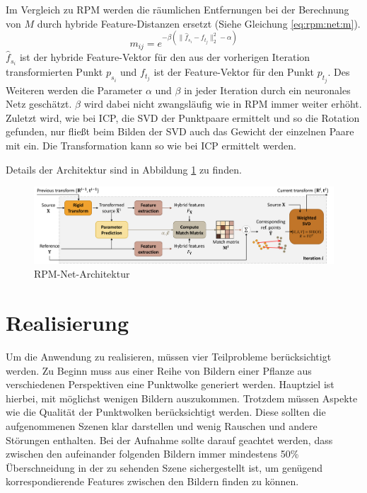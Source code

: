 \documentclass[12pt,titlepage, twoside]{article}
\begin{document}
Im Vergleich zu RPM werden die räumlichen Entfernungen bei der Berechnung von $M$ durch hybride Feature-Distanzen ersetzt (Siehe Gleichung \ref{eq:rpm:net:m}).
\begin{equation}
    \label{eq:rpm:net:m}
    m_{ij} = e^{-\beta(\|\hat{f}_{s_i} - f_{t_j}\|_2^2-\alpha)}
\end{equation}
$\hat{f}_{s_i}$ ist der hybride Feature-Vektor für den aus der vorherigen Iteration transformierten Punkt $p_{s_i}$ und $f_{t_j}$ ist der Feature-Vektor für den Punkt $p_{t_j}$.
Des Weiteren werden die Parameter $\alpha$ und $\beta$ in jeder Iteration durch ein neuronales Netz geschätzt. 
$\beta$ wird dabei nicht zwangsläufig wie in RPM immer weiter erhöht.
Zuletzt wird, wie bei ICP, die SVD der Punktpaare ermittelt und so die Rotation gefunden, nur fließt beim Bilden der SVD auch das Gewicht der einzelnen Paare mit ein. 
Die Transformation kann so wie bei ICP ermittelt werden. 

 Details der Architektur sind in Abbildung \ref{fig:rpm:net:arch} zu finden.

\begin{figure}
    \centering
    \includegraphics[width=1.0\textwidth]{./Images/RPM_Net_Arch.png}
    \caption{RPM-Net-Architektur \cite{Yew_2020}}
    \label{fig:rpm:net:arch}
\end{figure}

\newpage
\section{Realisierung}
\label{sec:realisierung}
Um die Anwendung zu realisieren, müssen vier Teilprobleme berücksichtigt werden. Zu Beginn muss aus einer Reihe von Bildern einer Pflanze aus verschiedenen Perspektiven eine Punktwolke generiert werden. 
Hauptziel ist hierbei, mit möglichst wenigen Bildern auszukommen. 
Trotzdem müssen Aspekte wie die Qualität der Punktwolken berücksichtigt werden. Diese sollten die aufgenommenen Szenen klar darstellen und wenig Rauschen und andere Störungen enthalten. 
Bei der Aufnahme sollte darauf geachtet werden, dass zwischen den aufeinander folgenden Bildern immer mindestens 50\% Überschneidung in der zu sehenden Szene sichergestellt ist, um genügend korrespondierende Features zwischen den Bildern finden zu können. 
\end{document}
